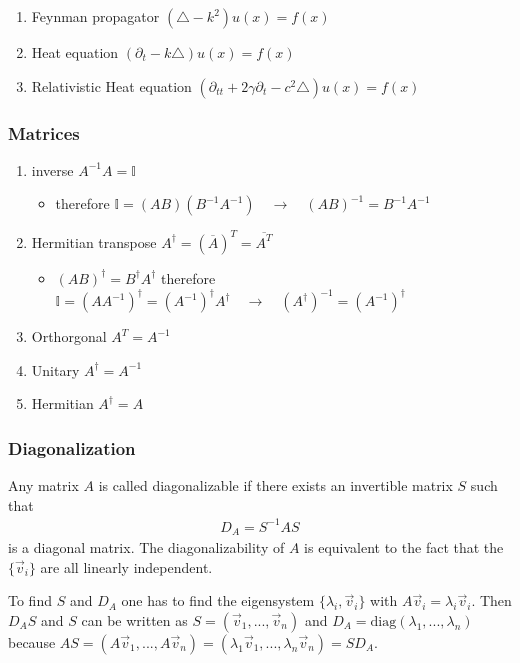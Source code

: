 \documentclass[10pt,a4paper]{article}
\theoremstyle{definition}
\begin{document}
\begin{enumerate}
\item Feynman propagator $\left(\triangle-k^2\right) u(x)= f(x)$
\item Heat equation $\left(\partial_{t}-k\triangle\right) u(x)= f(x)$
\item Relativistic Heat equation $\left(\partial_{tt}+2\gamma\partial_t-c^2\triangle\right) u(x)= f(x)$
\end{enumerate}



\subsubsection{Matrices}
\begin{enumerate}
    \item inverse $A^{-1}A=\mathbb{I}$
    \begin{itemize}
        \item therefore $\mathbb{I}=(AB)(B^{-1}A^{-1})\quad\rightarrow\quad (AB)^{-1}=B^{-1}A^{-1}$
    \end{itemize}
    \item Hermitian transpose $A^\dagger = (\overline{A})^T = \overline{A^T}$
        \begin{itemize}
        \item $(AB)^\dagger=B^\dagger A^\dagger$ therefore $\mathbb{I}=(AA^{-1})^\dagger=(A^{-1})^\dagger A^\dagger\quad\rightarrow\quad (A^\dagger)^{-1}=(A^{-1})^\dagger$
    \end{itemize}
    \item Orthorgonal $A^T = A^{-1}$
    \item Unitary $A^\dagger = A^{-1}$
    \item Hermitian $A^\dagger = A$
\end{enumerate}

\subsubsection{Diagonalization}
Any  matrix $A$ is called diagonalizable if there exists an invertible matrix $S$ such that
\begin{align}
    D_A=S^{-1}AS
\end{align}
is a diagonal matrix. The diagonalizability of $A$ is equivalent to the fact that the $\{\vec{v}_i\}$ are all linearly independent.

To find $S$ and $D_A$ one has to find the eigensystem $\{\lambda_i,\vec{v}_i\}$ with $A\vec{v}_i=\lambda_i\vec{v}_i$. Then $D_AS$ and $S$ can be written as $S=(\vec{v}_1,...,\vec{v}_n)$ and $D_A=\text{diag}(\lambda_1,...,\lambda_n)$ because $AS=(A\vec{v}_1,...,A\vec{v}_n)=(\lambda_1\vec{v}_1,...,\lambda_n\vec{v}_n)=SD_A$.
\end{document}
